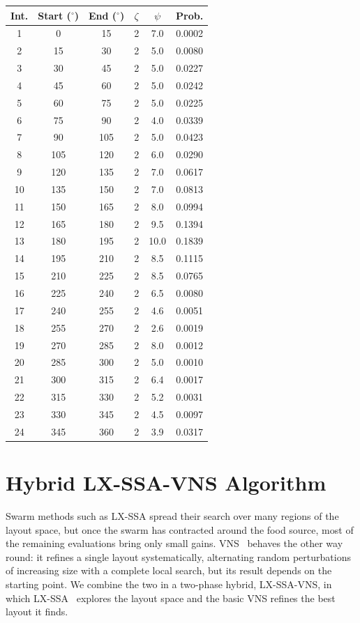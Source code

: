 \documentclass[journal,twoside]{IEEEtran}
\begin{document}
\begin{table}[htbp]
\begin{minipage}{0.49\textwidth}
\begin{tabular}{cccccc}
\toprule
\textbf{Int.} & \textbf{Start ($^\circ$)} & \textbf{End ($^\circ$)} & \textbf{$\zeta$} & \textbf{$\psi$} & \textbf{Prob.} \\
\midrule
1  & 0   & 15  & 2 & 7.0  & 0.0002 \\
2  & 15  & 30  & 2 & 5.0  & 0.0080 \\
3  & 30  & 45  & 2 & 5.0  & 0.0227 \\
4  & 45  & 60  & 2 & 5.0  & 0.0242 \\
5  & 60  & 75  & 2 & 5.0  & 0.0225 \\
6  & 75  & 90  & 2 & 4.0  & 0.0339 \\
7  & 90  & 105 & 2 & 5.0  & 0.0423 \\
8  & 105 & 120 & 2 & 6.0  & 0.0290 \\
9  & 120 & 135 & 2 & 7.0  & 0.0617 \\
10 & 135 & 150 & 2 & 7.0  & 0.0813 \\
11 & 150 & 165 & 2 & 8.0  & 0.0994 \\
12 & 165 & 180 & 2 & 9.5  & 0.1394 \\
13 & 180 & 195 & 2 & 10.0 & 0.1839 \\
14 & 195 & 210 & 2 & 8.5  & 0.1115 \\
15 & 210 & 225 & 2 & 8.5  & 0.0765 \\
16 & 225 & 240 & 2 & 6.5  & 0.0080 \\
17 & 240 & 255 & 2 & 4.6  & 0.0051 \\
18 & 255 & 270 & 2 & 2.6  & 0.0019 \\
19 & 270 & 285 & 2 & 8.0  & 0.0012 \\
20 & 285 & 300 & 2 & 5.0  & 0.0010 \\
21 & 300 & 315 & 2 & 6.4  & 0.0017 \\
22 & 315 & 330 & 2 & 5.2  & 0.0031 \\
23 & 330 & 345 & 2 & 4.5  & 0.0097 \\
24 & 345 & 360 & 2 & 3.9  & 0.0317 \\
\bottomrule
\end{tabular}
\label{tab:wind_data_II}
\end{minipage}
\end{table}


\section{Hybrid LX-SSA-VNS Algorithm}
\label{sec:hybrid}
Swarm methods such as LX-SSA spread their search over many regions of the layout space, but once the swarm has contracted around the food source, most of the remaining evaluations bring only small gains. VNS~\cite{Mladenovic1997,Hansen2001} behaves the other way round: it refines a single layout systematically, alternating random perturbations of increasing size with a complete local search, but its result depends on the starting point. We combine the two in a two-phase hybrid, LX-SSA-VNS, in which LX-SSA~\cite{Solanki2023} explores the layout space and the basic VNS refines the best layout it finds.
\end{document}
